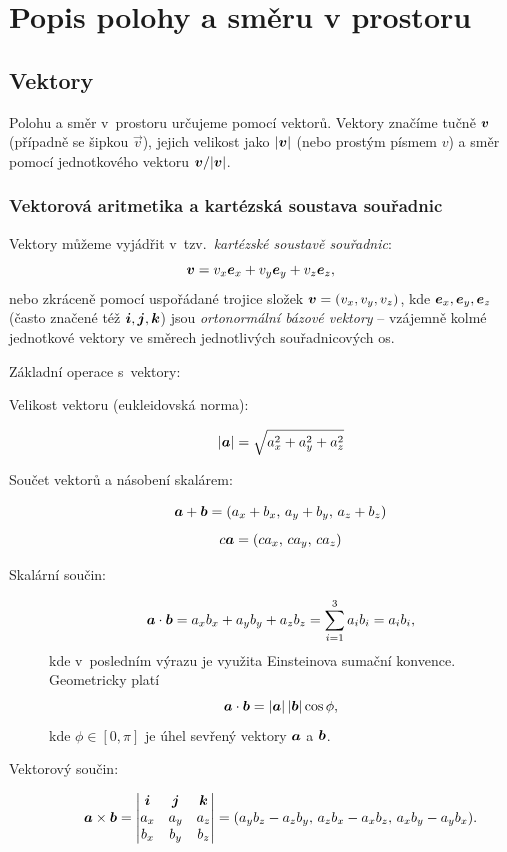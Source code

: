 \chapter{Popis polohy a směru v prostoru}

\section{Vektory}

Polohu a směr v~prostoru určujeme pomocí vektorů. Vektory značíme tučně $\bm{v}$ (případně se šipkou $\vec{v}$), jejich velikost jako $|\bm{v}|$ (nebo prostým písmem $v$) a směr pomocí jednotkového vektoru $\bm{v}/|\bm{v}|$.

\subsection{Vektorová aritmetika a kartézská soustava souřadnic}

Vektory můžeme vyjádřit v~tzv.~\emph{kartézské soustavě souřadnic}:
$$ \bm{v} = v_x\bm{e}_x + v_y\bm{e}_y + v_z\bm{e}_z, $$
nebo zkráceně pomocí uspořádané trojice složek $\bm{v} = (v_x, v_y, v_z)$, kde $\bm{e}_x, \bm{e}_y, \bm{e}_z$ (často značené též $\bm{i}, \bm{j}, \bm{k}$) jsou \emph{ortonormální bázové vektory} -- vzájemně kolmé jednotkové vektory ve směrech jednotlivých souřadnicových os.

Základní operace s~vektory:
\begin{description}
    \item[Velikost vektoru (eukleidovská norma):]
    $$ |\bm{a}| = \sqrt{a_x^2 + a_y^2 + a_z^2} $$
    \item[Součet vektorů a násobení skalárem:]
    $$ \bm{a} + \bm{b} = (a_x + b_x,\, a_y + b_y,\, a_z + b_z) $$
    $$ c \bm{a} = (c a_x,\, c a_y,\, c a_z) $$
    \item[Skalární součin:]
    $$ \bm{a}\cdot\bm{b} = a_x b_x + a_y b_y + a_z b_z = \sum_{i=1}^{3} a_i b_i = a_i b_i, $$
    kde v~posledním výrazu je využita Einsteinova sumační konvence. Geometricky platí
    $$ \bm{a}\cdot\bm{b} = |\bm{a}|\,|\bm{b}|\cos\phi, $$
    kde $\phi \in [0, \pi]$ je úhel sevřený vektory $\bm{a}$ a $\bm{b}$.
    \item[Vektorový součin:]
    $$ \bm{a} \times \bm{b} = \begin{vmatrix}
        \bm{i} & \bm{j} & \bm{k} \\
        a_x & a_y & a_z \\
        b_x & b_y & b_z
    \end{vmatrix} = (a_y b_z - a_z b_y,\, a_z b_x - a_x b_z,\, a_x b_y - a_y b_x). $$
\end{description}

